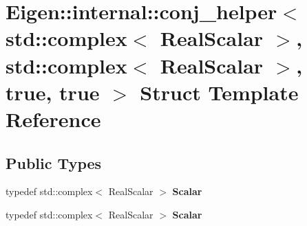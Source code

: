 \hypertarget{struct_eigen_1_1internal_1_1conj__helper_3_01std_1_1complex_3_01_real_scalar_01_4_00_01std_1_1co7e279017f32d052cf58f01f1590ee000}{}\section{Eigen\+:\+:internal\+:\+:conj\+\_\+helper$<$ std\+:\+:complex$<$ Real\+Scalar $>$, std\+:\+:complex$<$ Real\+Scalar $>$, true, true $>$ Struct Template Reference}
\label{struct_eigen_1_1internal_1_1conj__helper_3_01std_1_1complex_3_01_real_scalar_01_4_00_01std_1_1co7e279017f32d052cf58f01f1590ee000}
\subsection*{Public Types}
\begin{DoxyCompactItemize}
\item 
\mbox{\label{struct_eigen_1_1internal_1_1conj__helper_3_01std_1_1complex_3_01_real_scalar_01_4_00_01std_1_1co7e279017f32d052cf58f01f1590ee000_ac76181c3b5e9b918adec8f754cc6df6e}} 
typedef std\+::complex$<$ Real\+Scalar $>$ {\bfseries Scalar}
\item 
\mbox{\label{struct_eigen_1_1internal_1_1conj__helper_3_01std_1_1complex_3_01_real_scalar_01_4_00_01std_1_1co7e279017f32d052cf58f01f1590ee000_ac76181c3b5e9b918adec8f754cc6df6e}} 
typedef std\+::complex$<$ Real\+Scalar $>$ {\bfseries Scalar}
\end{DoxyCompactItemize}

